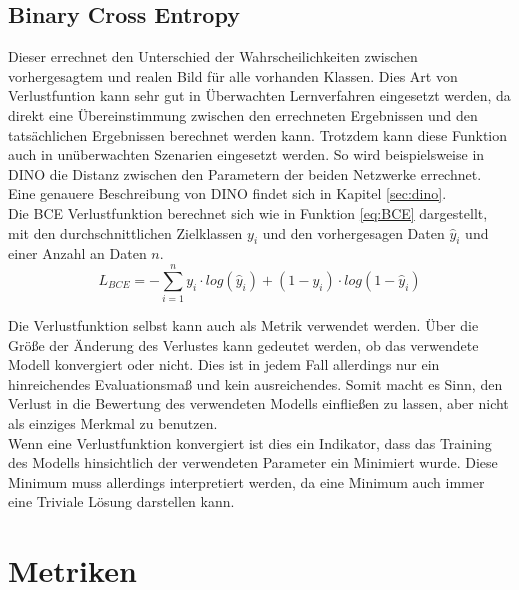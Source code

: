 \subsection{Binary Cross Entropy}
Dieser errechnet den Unterschied der Wahrscheilichkeiten zwischen vorhergesagtem und realen Bild für alle vorhanden Klassen. Dies Art von Verlustfuntion kann sehr gut in Überwachten Lernverfahren eingesetzt werden, da direkt eine Übereinstimmung zwischen den errechneten Ergebnissen und den tatsächlichen Ergebnissen berechnet werden kann. Trotzdem kann diese Funktion auch in unüberwachten Szenarien eingesetzt werden. So wird beispielsweise in DINO \cite{caron2021emerging} die Distanz zwischen den Parametern der beiden Netzwerke errechnet. Eine genauere Beschreibung von DINO findet sich in Kapitel \ref{sec:dino}.\\
Die BCE Verlustfunktion berechnet sich wie in Funktion \ref{eq:BCE} dargestellt, mit den durchschnittlichen Zielklassen $y_{i}$ und den vorhergesagen Daten $\hat{y}_{i}$ und einer Anzahl an Daten $n$. 
\begin{equation}
L_{BCE} = -\sum_{i=1}^{n}{y_i \cdot log(\hat y_i) + (1- y_i)\cdot  log (1-\hat y_i)} 
\label{eq:BCE}    
\end{equation}

Die Verlustfunktion selbst kann auch als Metrik verwendet werden. Über die Größe der Änderung des Verlustes kann gedeutet werden, ob das verwendete Modell konvergiert oder nicht. Dies ist in jedem Fall allerdings nur ein hinreichendes Evaluationsmaß und kein ausreichendes. Somit macht es Sinn, den Verlust in die Bewertung des verwendeten Modells einfließen zu lassen, aber nicht als einziges Merkmal zu benutzen. \\
Wenn eine Verlustfunktion konvergiert ist dies ein Indikator, dass das Training des Modells hinsichtlich der verwendeten Parameter ein Minimiert wurde. Diese Minimum muss allerdings interpretiert werden, da eine Minimum auch immer eine Triviale Lösung darstellen kann. 

\section{Metriken}
\label{sec:metrics}

